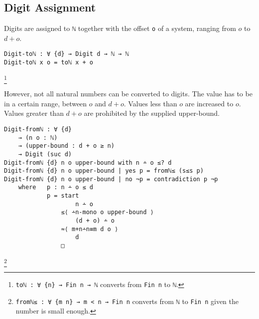 \documentclass[\main/thesis.tex]{subfiles}
\begin{document}
\subsection{Digit Assignment}

\begin{center}
\end{center}

Digits are assigned to {\lstinline|ℕ|} together with the offset {\lstinline|o|} of a system,
ranging from $ o $ to $ d + o $.

\begin{lstlisting}
Digit-toℕ : ∀ {d} → Digit d → ℕ → ℕ
Digit-toℕ x o = toℕ x + o
\end{lstlisting}
\footnote{
    {\lstinline|toℕ : ∀ {n} → Fin n → ℕ|}
    \newline\hspace*{4em} converts from {\lstinline|Fin n|} to {\lstinline|ℕ|}.
}


However, not all natural numbers can be converted to digits.
The value has to be in a certain range, between $ o $ and $ d + o $.
Values less than $ o $ are increased to $ o $.
Values greater than $ d + o $ are prohibited by the supplied upper-bound.

\begin{lstlisting}
Digit-fromℕ : ∀ {d}
    → (n o : ℕ)
    → (upper-bound : d + o ≥ n)
    → Digit (suc d)
Digit-fromℕ {d} n o upper-bound with n ∸ o ≤? d
Digit-fromℕ {d} n o upper-bound | yes p = fromℕ≤ (s≤s p)
Digit-fromℕ {d} n o upper-bound | no ¬p = contradiction p ¬p
    where   p : n ∸ o ≤ d
            p = start
                    n ∸ o
                ≤⟨ ∸n-mono o upper-bound ⟩
                    (d + o) ∸ o
                ≈⟨ m+n∸n≡m d o ⟩
                    d
                □
\end{lstlisting}
\footnote{
    {\lstinline|fromℕ≤ : ∀ {m n} → m < n → Fin n|}
    \newline\hspace*{4em} converts from {\lstinline|ℕ|} to {\lstinline|Fin n|} given the number is small enough.
}
\end{document}
